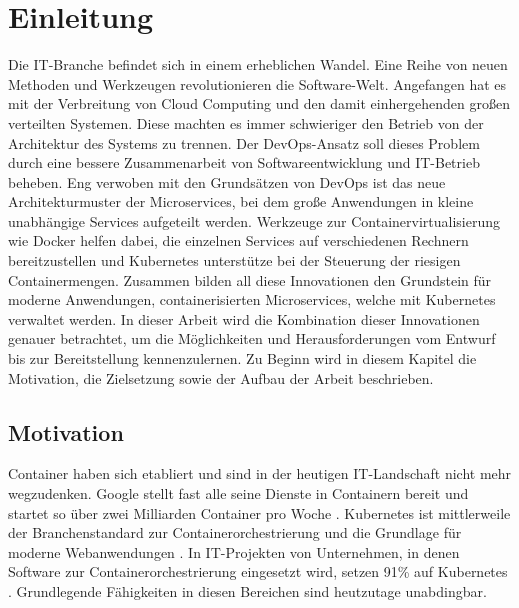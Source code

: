 \section{Einleitung}

\vspace{1em} 

Die IT-Branche befindet sich in einem erheblichen Wandel. Eine Reihe von neuen Methoden und Werkzeugen revolutionieren die Software-Welt. Angefangen hat es mit der Verbreitung von Cloud Computing und den damit einhergehenden großen verteilten Systemen. Diese machten es immer schwieriger den Betrieb von der Architektur des Systems zu trennen. Der DevOps-Ansatz soll dieses Problem durch eine bessere Zusammenarbeit von Softwareentwicklung und IT-Betrieb beheben. Eng verwoben mit den Grundsätzen von DevOps ist das neue Architekturmuster der Microservices, bei dem große Anwendungen in kleine unabhängige Services aufgeteilt werden. Werkzeuge zur Containervirtualisierung wie Docker helfen dabei, die einzelnen Services auf verschiedenen Rechnern bereitzustellen und Kubernetes unterstütze bei der Steuerung der riesigen Containermengen. Zusammen bilden all diese Innovationen den Grundstein für moderne Anwendungen, containerisierten Microservices, welche mit Kubernetes verwaltet werden. In dieser Arbeit wird die Kombination dieser Innovationen genauer betrachtet, um die Möglichkeiten und Herausforderungen vom Entwurf bis zur Bereitstellung kennenzulernen. Zu Beginn wird in diesem Kapitel die Motivation, die Zielsetzung sowie der Aufbau der Arbeit beschrieben.

\subsection{Motivation}

Container haben sich etabliert und sind in der heutigen IT-Landschaft nicht mehr wegzudenken. Google stellt fast alle seine Dienste in Containern bereit und startet so über zwei Milliarden Container pro Woche \parencite[vgl.][S. 43]{liebelSkalierbare2021}. Kubernetes ist mittlerweile der Branchenstandard zur Containerorchestrierung und die Grundlage für moderne Webanwendungen \parencite[vgl.][Vorwort]{arundelCloud2019}. In IT-Projekten von Unternehmen, in denen Software zur Containerorchestrierung eingesetzt wird, setzen 91\% auf Kubernetes \parencite[vgl.][S. 8]{cloudnativecomputingfoundationCloud2020}. Grundlegende Fähigkeiten in diesen Bereichen sind heutzutage unabdingbar.

